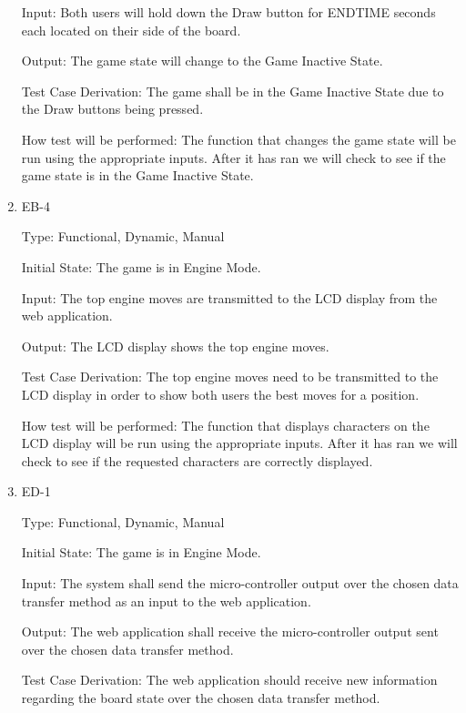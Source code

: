 \documentclass[12pt, titlepage]{article}
\begin{document}
\begin{enumerate}
    Input: Both users will hold down the Draw button for ENDTIME seconds each located on their side of the board.
                        
    Output: The game state will change to the Game Inactive State.
                        
    Test Case Derivation: The game shall be in the Game Inactive State due to the Draw buttons being pressed.
    
    How test will be performed: The function that changes the game state will be run using the appropriate inputs.
    After it has ran we will check to see if the game state is in the Game Inactive State.

    \item{EB-4\\}

    Type: Functional, Dynamic, Manual
                      
    Initial State: The game is in Engine Mode.
                        
    Input: The top engine moves are transmitted to the LCD display from the web application.
                        
    Output: The LCD display shows the top engine moves.
                        
    Test Case Derivation: The top engine moves need to be transmitted
    to the LCD display in order to show both users the best moves for a position.
    
    How test will be performed: The function that displays characters on the LCD display will be run using the appropriate inputs.
    After it has ran we will check to see if the requested characters are correctly displayed.

    \item{ED-1\\}

    Type: Functional, Dynamic, Manual
                      
    Initial State: The game is in Engine Mode.
                        
    Input: The system shall send the micro-controller output over the chosen data transfer
    method as an input to the web application.
                        
    Output: The web application shall receive the micro-controller output sent over the chosen data transfer
    method.
                        
    Test Case Derivation: The web application should receive new information regarding the board state over the chosen data transfer method. 


\end{enumerate}
\end{document}
